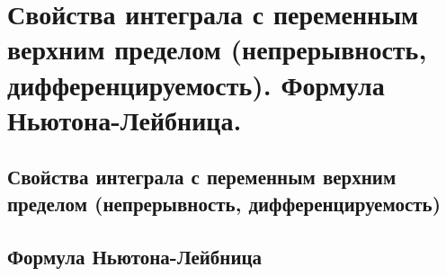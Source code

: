 \chapter{Свойства интеграла с переменным верхним пределом (непрерывность, дифференцируемость). Формула Ньютона-Лейбница.}
\section{Свойства интеграла с переменным верхним пределом (непрерывность, дифференцируемость)}
\section{Формула Ньютона-Лейбница}